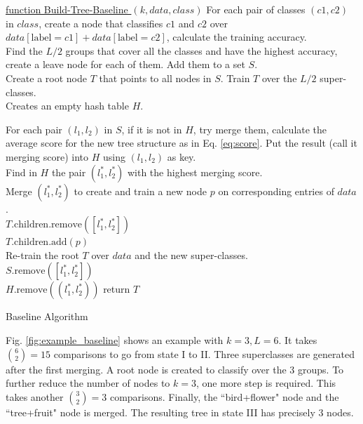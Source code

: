 \documentclass{article}
\begin{document}
\begin{algorithm}[H]\label{ag:baseline}

    \underline{function Build-Tree-Baseline $(k, data, class)$}\;
    For each pair of classes $(c1,c2)$ in $class$, create a node that classifies $c1$ and $c2$ over $data[\text{label}=c1]+data[\text{label}=c2]$, calculate the training accuracy.\\
    Find the $L/2$ groups that cover all the classes and have the highest accuracy, create a leave node for each of them. Add them to a set $S$.\\
    Create a root node $T$ that points to all nodes in $S$. Train $T$ over the $L/2$ super-classes.\\
    Creates an empty hash table $H$.
    
      {
        For each pair $(l_1,l_2)$ in $S$, if it is not in $H$, try merge them, calculate the average score for the new tree structure as in Eq. \ref{eq:score}. Put the result (call it merging score) into $H$ using $(l_1,l_2)$ as key.\\
        Find in $H$ the pair $(l_1^*,l_2^*)$ with the highest merging score.\\
        Merge $(l_1^*,l_2^*)$ to create and train a new node $p$ on corresponding entries of $data$.\\
        $T.\text{children.remove}([l_1^*,l_2^*])$\\ $T.\text{children.add}(p)$\\
        Re-train the root $T$ over $data$ and the new super-classes.\\
        $S.\text{remove}([l_1^*,l_2^*])$\\
        $H.\text{remove}((l_1^*,l_2^*))$
      }
    return $T$\;
    \caption{Baseline Algorithm}
\end{algorithm}

Fig. \ref{fig:example_baseline} shows an example with $k=3, L=6$. It takes $\binom{6}{2}=15$ comparisons to go from state I to II. Three superclasses are generated after the first merging. A root node is created to classify over the 3 groups. To further reduce the number of nodes to 
$k=3$, one more step is required. This takes another $\binom{3}{2}=3$ comparisons. Finally, the ``bird+flower" node and the ``tree+fruit" node is merged. The resulting tree in state III has precisely 3 nodes.
\end{document}
